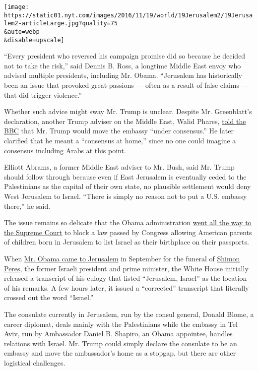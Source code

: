 \texttt{[image: https://static01.nyt.com/images/2016/11/19/world/19Jerusalem2/19Jerusalem2-articleLarge.jpg?quality=75\\\&auto=webp\\\&disable=upscale]}

``Every president who reversed his campaign promise did so because he
decided not to take the risk,'' said Dennis B. Ross, a longtime Middle
East envoy who advised multiple presidents, including Mr. Obama.
``Jerusalem has historically been an issue that provoked great passions
--- often as a result of false claims --- that did trigger violence.''

Whether such advice might sway Mr. Trump is unclear. Despite Mr.
Greenblatt's declaration, another Trump adviser on the Middle East,
Walid Phares,
\href{https://soundcloud.com/user-735086019/walid-phares}{told the BBC}
that Mr. Trump would move the embassy ``under consensus.'' He later
clarified that he meant a ``consensus at home,'' since no one could
imagine a consensus including Arabs at this point.

Elliott Abrams, a former Middle East adviser to Mr. Bush, said Mr. Trump
should follow through because even if East Jerusalem is eventually ceded
to the Palestinians as the capital of their own state, no plausible
settlement would deny West Jerusalem to Israel. ``There is simply no
reason not to put a U.S. embassy there,'' he said.

The issue remains so delicate that the Obama administration
\href{http://www.nytimes.com/2015/06/09/us/politics/supreme-court-backs-white-house-on-jerusalem-passport-dispute.html?_r=0}{went
all the way to the Supreme Court} to block a law passed by Congress
allowing American parents of children born in Jerusalem to list Israel
as their birthplace on their passports.

When
\href{http://www.nytimes.com/2016/10/01/world/middleeast/shimon-peres-funeral.html}{Mr.
Obama came to Jerusalem} in September for the funeral of
\href{http://www.nytimes.com/topic/person/shimon-peres?inline=nyt-per}{Shimon
Peres}, the former Israeli president and prime minister, the White House
initially released a transcript of his eulogy that listed ``Jerusalem,
Israel'' as the location of his remarks. A few hours later, it issued a
``corrected'' transcript that literally crossed out the word ``Israel.''

The consulate currently in Jerusalem, run by the consul general, Donald
Blome, a career diplomat, deals mainly with the Palestinians while the
embassy in Tel Aviv, run by Ambassador Daniel B. Shapiro, an Obama
appointee, handles relations with Israel. Mr. Trump could simply declare
the consulate to be an embassy and move the ambassador's home as a
stopgap, but there are other logistical challenges.

